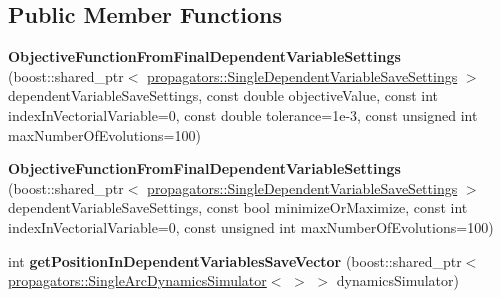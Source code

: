 \subsection*{Public Member Functions}
\begin{DoxyCompactItemize}
\item 
{\bfseries Objective\+Function\+From\+Final\+Dependent\+Variable\+Settings} (boost\+::shared\+\_\+ptr$<$ \hyperlink{classtudat_1_1propagators_1_1SingleDependentVariableSaveSettings}{propagators\+::\+Single\+Dependent\+Variable\+Save\+Settings} $>$ dependent\+Variable\+Save\+Settings, const double objective\+Value, const int index\+In\+Vectorial\+Variable=0, const double tolerance=1e-\/3, const unsigned int max\+Number\+Of\+Evolutions=100)\hypertarget{structtudat_1_1optimization_1_1ObjectiveFunctionFromFinalDependentVariableSettings_aa330e57dd0655f8edbd28b84ca5c1443}{}\label{structtudat_1_1optimization_1_1ObjectiveFunctionFromFinalDependentVariableSettings_aa330e57dd0655f8edbd28b84ca5c1443}

\item 
{\bfseries Objective\+Function\+From\+Final\+Dependent\+Variable\+Settings} (boost\+::shared\+\_\+ptr$<$ \hyperlink{classtudat_1_1propagators_1_1SingleDependentVariableSaveSettings}{propagators\+::\+Single\+Dependent\+Variable\+Save\+Settings} $>$ dependent\+Variable\+Save\+Settings, const bool minimize\+Or\+Maximize, const int index\+In\+Vectorial\+Variable=0, const unsigned int max\+Number\+Of\+Evolutions=100)\hypertarget{structtudat_1_1optimization_1_1ObjectiveFunctionFromFinalDependentVariableSettings_ad40fbe160af3a431beff444a332f341f}{}\label{structtudat_1_1optimization_1_1ObjectiveFunctionFromFinalDependentVariableSettings_ad40fbe160af3a431beff444a332f341f}

\item 
int {\bfseries get\+Position\+In\+Dependent\+Variables\+Save\+Vector} (boost\+::shared\+\_\+ptr$<$ \hyperlink{classtudat_1_1propagators_1_1SingleArcDynamicsSimulator}{propagators\+::\+Single\+Arc\+Dynamics\+Simulator}$<$  $>$ $>$ dynamics\+Simulator)\hypertarget{structtudat_1_1optimization_1_1ObjectiveFunctionFromFinalDependentVariableSettings_a3f93e4dadb4b6f2498fcab47eb739773}{}\label{structtudat_1_1optimization_1_1ObjectiveFunctionFromFinalDependentVariableSettings_a3f93e4dadb4b6f2498fcab47eb739773}

\end{DoxyCompactItemize}
